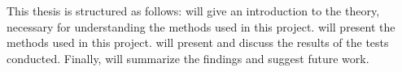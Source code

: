 This thesis is structured as follows:  will give an introduction to the theory, necessary for understanding the methods used in this project.  will present the methods used in this project.  will present and discuss the results of the tests conducted. Finally,  will summarize the findings and suggest future work. 


